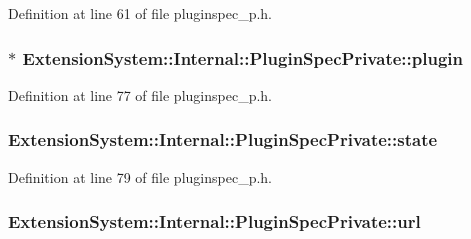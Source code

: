 Definition at line 61 of file pluginspec\-\_\-p.\-h.

\hypertarget{class_extension_system_1_1_internal_1_1_plugin_spec_private_a45c4fa79923c8d0624258b8f733125f1}{
\subsubsection[{plugin}]{$\ast$ Extension\-System\-::\-Internal\-::\-Plugin\-Spec\-Private\-::plugin}}\label{class_extension_system_1_1_internal_1_1_plugin_spec_private_a45c4fa79923c8d0624258b8f733125f1}


Definition at line 77 of file pluginspec\-\_\-p.\-h.

\hypertarget{class_extension_system_1_1_internal_1_1_plugin_spec_private_a1806625ef956622e6727d0b0d50274aa}{
\subsubsection[{state}]{ Extension\-System\-::\-Internal\-::\-Plugin\-Spec\-Private\-::state}}\label{class_extension_system_1_1_internal_1_1_plugin_spec_private_a1806625ef956622e6727d0b0d50274aa}


Definition at line 79 of file pluginspec\-\_\-p.\-h.

\hypertarget{class_extension_system_1_1_internal_1_1_plugin_spec_private_a6872e7bd6f42c91c16e3fcd03554f004}{
\subsubsection[{url}]{ Extension\-System\-::\-Internal\-::\-Plugin\-Spec\-Private\-::url}}\label{class_extension_system_1_1_internal_1_1_plugin_spec_private_a6872e7bd6f42c91c16e3fcd03554f004}


